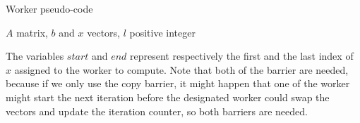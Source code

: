 \documentclass[12pt]{article}
\begin{document}
	
	\begin{algorithm}[H]
		\caption{Worker pseudo-code}\label{alg:par}
		\begin{algorithmic}[1]
			\Require $A$ matrix, $b$ and $x$ vectors, $l$ positive integer
			\EndIf
			\EndFor
			\EndFor
			\EndIf
			\EndWhile
		\end{algorithmic}
	\end{algorithm}
	The variables $start$ and $end$ represent respectively the first and the last index of $x$ assigned to the worker to compute. Note that both of the barrier are needed, because if we only use the copy barrier, it might happen that one of the worker might start the next iteration before the designated worker could swap the vectors and update the iteration counter, so both barriers are needed. 
	
	
\end{document}

